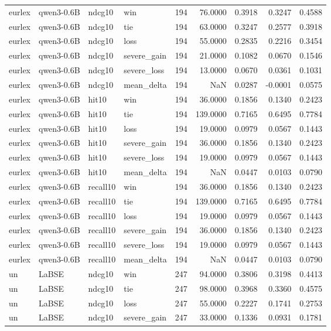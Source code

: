 \begin{tabular}{llllrrrrr}
eurlex & qwen3-0.6B & ndcg10 & win & 194 & 76.0000 & 0.3918 & 0.3247 & 0.4588 \\
eurlex & qwen3-0.6B & ndcg10 & tie & 194 & 63.0000 & 0.3247 & 0.2577 & 0.3918 \\
eurlex & qwen3-0.6B & ndcg10 & loss & 194 & 55.0000 & 0.2835 & 0.2216 & 0.3454 \\
eurlex & qwen3-0.6B & ndcg10 & severe\_gain & 194 & 21.0000 & 0.1082 & 0.0670 & 0.1546 \\
eurlex & qwen3-0.6B & ndcg10 & severe\_loss & 194 & 13.0000 & 0.0670 & 0.0361 & 0.1031 \\
eurlex & qwen3-0.6B & ndcg10 & mean\_delta & 194 & NaN & 0.0287 & -0.0001 & 0.0575 \\
eurlex & qwen3-0.6B & hit10 & win & 194 & 36.0000 & 0.1856 & 0.1340 & 0.2423 \\
eurlex & qwen3-0.6B & hit10 & tie & 194 & 139.0000 & 0.7165 & 0.6495 & 0.7784 \\
eurlex & qwen3-0.6B & hit10 & loss & 194 & 19.0000 & 0.0979 & 0.0567 & 0.1443 \\
eurlex & qwen3-0.6B & hit10 & severe\_gain & 194 & 36.0000 & 0.1856 & 0.1340 & 0.2423 \\
eurlex & qwen3-0.6B & hit10 & severe\_loss & 194 & 19.0000 & 0.0979 & 0.0567 & 0.1443 \\
eurlex & qwen3-0.6B & hit10 & mean\_delta & 194 & NaN & 0.0447 & 0.0103 & 0.0790 \\
eurlex & qwen3-0.6B & recall10 & win & 194 & 36.0000 & 0.1856 & 0.1340 & 0.2423 \\
eurlex & qwen3-0.6B & recall10 & tie & 194 & 139.0000 & 0.7165 & 0.6495 & 0.7784 \\
eurlex & qwen3-0.6B & recall10 & loss & 194 & 19.0000 & 0.0979 & 0.0567 & 0.1443 \\
eurlex & qwen3-0.6B & recall10 & severe\_gain & 194 & 36.0000 & 0.1856 & 0.1340 & 0.2423 \\
eurlex & qwen3-0.6B & recall10 & severe\_loss & 194 & 19.0000 & 0.0979 & 0.0567 & 0.1443 \\
eurlex & qwen3-0.6B & recall10 & mean\_delta & 194 & NaN & 0.0447 & 0.0103 & 0.0790 \\
un & LaBSE & ndcg10 & win & 247 & 94.0000 & 0.3806 & 0.3198 & 0.4413 \\
un & LaBSE & ndcg10 & tie & 247 & 98.0000 & 0.3968 & 0.3360 & 0.4575 \\
un & LaBSE & ndcg10 & loss & 247 & 55.0000 & 0.2227 & 0.1741 & 0.2753 \\
un & LaBSE & ndcg10 & severe\_gain & 247 & 33.0000 & 0.1336 & 0.0931 & 0.1781 \\

\end{tabular}
